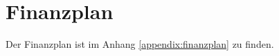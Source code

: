 \clearpage
\appendix

\section{Finanzplan}

Der Finanzplan ist im Anhang \ref{appendix:finanzplan} zu finden.

\listoffigures

\listoftables

 


\label{appendix:finanzplan}



